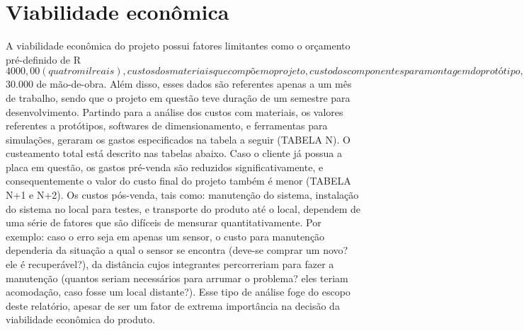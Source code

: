 \section{Viabilidade econômica}
A viabilidade econômica do projeto possui fatores limitantes como o orçamento pré-definido de R$4000,00 (quatro mil reais), custos dos materiais que compõem o projeto, custo dos componentes para montagem do protótipo, e uma série de custos pós-venda do produto. 
Sendo um projeto de relevante complexidade e especificidade, o público alvo para venda é bastante restrito, trazendo pontos positivos e negativos ao desenvolvimento de um plano de vendas. Dentre os pontos positivos, pode ser citada a possível fidelização do cliente com os desenvolvedores do sistema de arrefecimento para o sensor, visto que poucas empresas são voltadas exclusivamente aos projetos de cunho universitário que abordam esse tema. Além disso, uma menor quantia será gasta com prospecção ativa, visto que a própria apresentação do serviço do cliente para outro público já aumenta consideravelmente o interesse da comunidade acadêmica pela solução apresentada por este projeto. 
Por outro lado, do ponto de vista negativo, nenhum dos componentes materiais do sistema são fabricados pelos idealizadores do projeto. Além disso, o próprio código feito para o Arduino é de domínio público, obrigando assim a disponibilização do código fonte para qualquer concorrente que requeira este arquivo. Dessa forma, caso os programadores destas empresas criassem um sistema melhor, e alterassem o código ao seu favor, o projeto desenvolvido pelo grupo se tornaria ultrapassado no mercado. 
A análise de viabilidade deste projeto não levou em consideração o custo das horas trabalhadas por estudante, visto que com um grupo de 30 estudantes, o projeto já começaria inválido, pois o preço médio de um estágio de engenharia é de aproximadamente 1000 reais por 120 horas mensais, o que resultaria em R$30.000 de mão-de-obra. Além disso, esses dados são referentes apenas a um mês de trabalho, sendo que o projeto em questão teve duração de um semestre para desenvolvimento. 
Partindo para a análise dos custos com materiais, os valores referentes a protótipos, softwares de dimensionamento, e ferramentas para simulações, geraram os gastos especificados na tabela a seguir (TABELA N). 
O custeamento total está descrito nas tabelas abaixo. Caso o cliente já possua a placa em questão, os gastos pré-venda são reduzidos significativamente, e consequentemente o valor do custo final do projeto também é menor (TABELA N+1 e N+2).
Os custos pós-venda, tais como: manutenção do sistema, instalação do sistema no local para testes, e transporte do produto até o local, dependem de uma série de fatores que são difíceis de mensurar quantitativamente. Por exemplo: caso o erro seja em apenas um sensor, o custo para manutenção dependeria da situação a qual o sensor se encontra (deve-se comprar um novo? ele é recuperável?), da distância cujos integrantes percorreriam para fazer a manutenção (quantos seriam necessários para arrumar o problema? eles teriam acomodação, caso fosse um local distante?). Esse tipo de análise foge do escopo deste relatório, apesar de ser um fator de extrema importância na decisão da viabilidade econômica do produto. 
 
